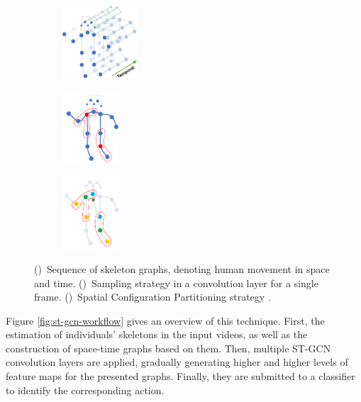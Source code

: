 \begin{figure}
    \centering
    \begin{subfigure}{.30\textwidth}
        \centering
        \includegraphics[height=2.7cm]{images/st_gcn_graph}
        \caption{}
        \label{fig:st-gcn-graph}
    \end{subfigure}
    \begin{subfigure}{.30\textwidth}
      \centering
      \includegraphics[height=2.7cm]{images/st_gcn_sampling}
      \caption{}
      \label{fig:st-gcn-sampling}
    \end{subfigure}
    \begin{subfigure}{.30\textwidth}
      \centering
      \includegraphics[height=2.7cm]{images/st_gcn_spatial_partitioning}
      \caption{}
      \label{fig:st-gcn-spatial-part}
    \end{subfigure}
    \caption{
        ()~Sequence of skeleton graphs, denoting human movement in space and time. 
        ()~Sampling strategy in a convolution layer for a single frame.
        ()~Spatial Configuration Partitioning strategy \cite{st-gcn-2018}.
    }
    \label{fig:graph_part_sampling}
\end{figure}

Figure \ref{fig:st-gcn-workflow} gives an overview of this technique. First, the estimation of individuals' skeletons in the input videos, as well as the construction of space-time graphs based on them. Then, multiple ST-GCN convolution layers are applied, gradually generating higher and higher levels of feature maps for the presented graphs. Finally, they are submitted to a classifier to identify the corresponding action.

